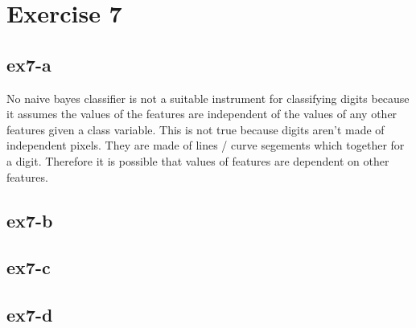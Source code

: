 \section{Exercise 7}
\subsection{ex7-a}
No naive bayes classifier is not a suitable instrument for classifying digits because it assumes the values of the
features are independent of the values of any other features given a class variable. This is not true because digits
aren't made of independent pixels. They are made of lines / curve segements which together for a digit. Therefore it
is possible that values of features are dependent on other features.

\subsection{ex7-b}

\subsection{ex7-c}

\subsection{ex7-d}
